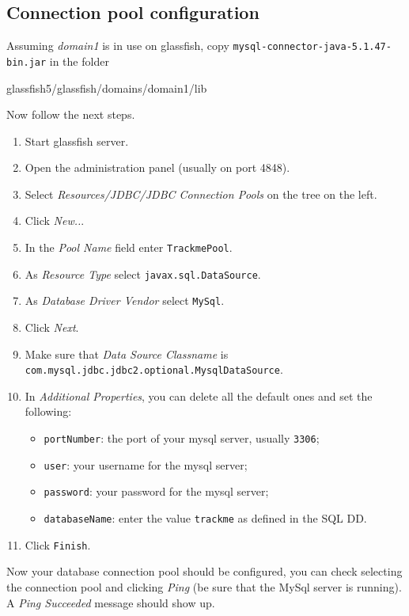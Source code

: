 \subsection{Connection pool configuration}
Assuming \textit{domain1} is in use on glassfish, copy \texttt{mysql-connector-java-5.1.47-bin.jar} in the folder

\begin{center}
glassfish5/glassfish/domains/domain1/lib 
\end{center}
Now follow the next steps.
\begin{enumerate}
\item Start glassfish server.
\item Open the administration panel (usually on port 4848).
\item Select \textit{Resources/JDBC/JDBC Connection Pools} on the tree on the left.
\item Click \textit{New..}.
\item In the \textit{Pool Name} field enter \texttt{TrackmePool}.
\item As \textit{Resource Type} select \texttt{javax.sql.DataSource}.
\item As \textit{Database Driver Vendor} select \texttt{MySql}.
\item Click \textit{Next}.
\item Make sure that \textit{Data Source Classname} is \texttt{com.mysql.jdbc.jdbc2.optional.MysqlDataSource}.
\item In \textit{Additional Properties}, you can delete all the default ones and set the following:
	\begin{itemize}
	\item \texttt{portNumber}: the port of your mysql server, usually \texttt{3306};
	\item \texttt{user}: your username for the mysql server;
	\item	\texttt{password}: your password for the mysql server;
	\item \texttt{databaseName}: enter the value \texttt{trackme} as defined in the SQL DD.
	\end{itemize}
\item Click \texttt{Finish}.
\end{enumerate}
Now your database connection pool should be configured, you can check selecting the connection pool and clicking \textit{Ping} (be sure that the MySql server is running).
A \textit{Ping Succeeded} message should show up.\vspace{1em}


